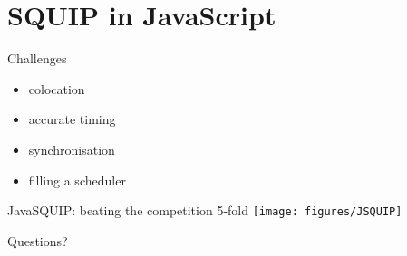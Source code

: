 \documentclass[aspectratio=169]{beamer}
\begin{document}
\section{SQUIP in JavaScript}

\begin{frame}{Challenges}
  \begin{itemize}
    \item{colocation }
    \item{accurate timing }
    \item{synchronisation }
    \item{filling a scheduler }
  \end{itemize}
\end{frame}


\begin{frame}{JavaSQUIP: beating the competition 5-fold}
  \centering
  \texttt{[image: figures/JSQUIP]}
\end{frame}

\begin{frame}[c]
  \centering
  \Large Questions?
\end{frame}
\end{document}
